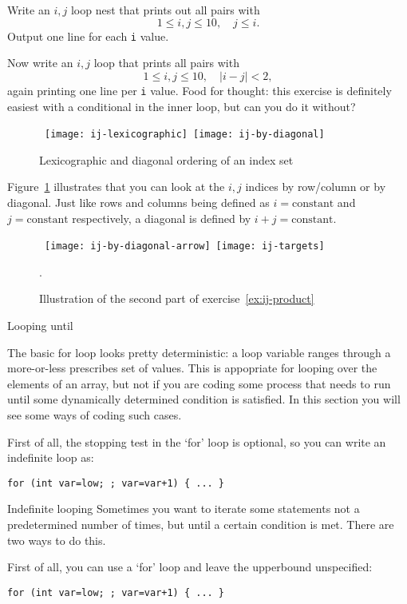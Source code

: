 \begin{exercise}
  \label{ex:ij-triangle}
  Write an $i,j$ loop nest that prints out all pairs with
  \[ 1\leq i,j\leq 10,\quad  j\leq i. \]
  Output one line for each \lstinline{i} value.

  Now write an $i,j$ loop that prints all pairs with
  \[ 1\leq i,j\leq 10,\quad |i-j|<2, \]
  again printing one line per \lstinline{i} value.
  Food for thought: this exercise is definitely easiest with a
  conditional in the inner loop, but can you do
  it without? 
\end{exercise}

\begin{figure}[ht]
  \hbox{%
    \texttt{[image: ij-lexicographic]}
    \texttt{[image: ij-by-diagonal]}
    }
  \caption{Lexicographic and diagonal ordering of an index set}  
  \label{fig:ij-lex}
\end{figure}

Figure~\ref{fig:ij-lex} illustrates that you can look at the $i,j$
indices by row/column or by diagonal. Just like rows and columns being
defined as $i=\mathrm{constant}$ and $j=\mathrm{constant}$
respectively,
a diagonal is defined by $i+j=\mathrm{constant}$.

\begin{figure}[ht]
  \hbox{%
    \texttt{[image: ij-by-diagonal-arrow]}
    \texttt{[image: ij-targets]}
    }
  \caption{Illustration of the second part of exercise~\ref{ex:ij-product}}.
  \label{fig:ij-min}
\end{figure}

 {Looping until}
\label{sec:loopuntil}

The basic for loop looks pretty deterministic: a loop variable ranges
through a more-or-less prescribes set of values. This is appopriate
for looping over the elements of an array, but not if you are coding
some process that needs to run until some dynamically determined
condition is satisfied. In this section you will see some ways of
coding such cases.

First of all, the stopping test in the `for' loop is optional, so you
can write an indefinite loop as:
\begin{lstlisting}
for (int var=low; ; var=var+1) { ... }
\end{lstlisting}

\begin{slide}{Indefinite looping}
  \label{sl:for-inf}
  Sometimes you want to iterate some statements not a predetermined
  number of times, but until a certain condition is met. There are two
  ways to do this.

  First of all, you can use a `for' loop and leave the upperbound
  unspecified:
\begin{lstlisting}
for (int var=low; ; var=var+1) { ... }
\end{lstlisting}
\end{slide}

